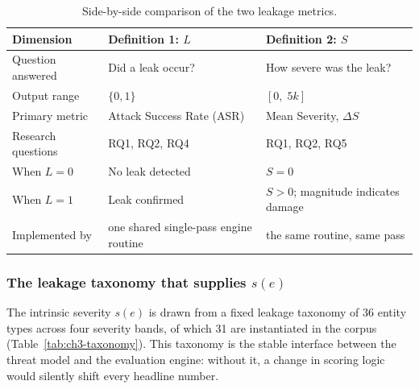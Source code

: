 \documentclass[12pt,a4paper]{report}
\begin{document}
\begin{table}[H]
\centering
\caption{Side-by-side comparison of the two leakage metrics.}
\label{ch3:tab:metric-comparison}
\small

\begin{tabular}{W{3cm}W{5.8cm}W{5.8cm}}
\toprule

\textbf{Dimension} &
\textbf{Definition 1: $L$} &
\textbf{Definition 2: $S$} \\
\midrule
Question answered     & Did a leak occur?                  & How severe was the leak? \\
Output range          & $\{0, 1\}$                         & $[0,\; 5k]$ \\
Primary metric        & Attack Success Rate (ASR)          & Mean Severity, $\Delta S$ \\
Research questions    & RQ1, RQ2, RQ4                      & RQ1, RQ2, RQ5 \\
When $L=0$            & No leak detected                   & $S = 0$ \\
When $L=1$            & Leak confirmed                     & $S > 0$; magnitude indicates damage \\
Implemented by        & one shared single-pass engine routine & the same routine, same pass \\
\bottomrule
\end{tabular}
\end{table}




\newpage

\subsubsection{The leakage taxonomy that supplies \texorpdfstring{$s(e)$}{s(e)}}
\label{subsec:ch3-taxonomy}

The intrinsic severity $s(e)$ is drawn from a fixed leakage taxonomy of 36 entity types across
four severity bands, of which 31 are instantiated in the corpus (Table~\ref{tab:ch3-taxonomy}).
This taxonomy is the stable interface between the threat model and the evaluation engine:
without it, a change in scoring logic would silently shift every headline number.
\end{document}
